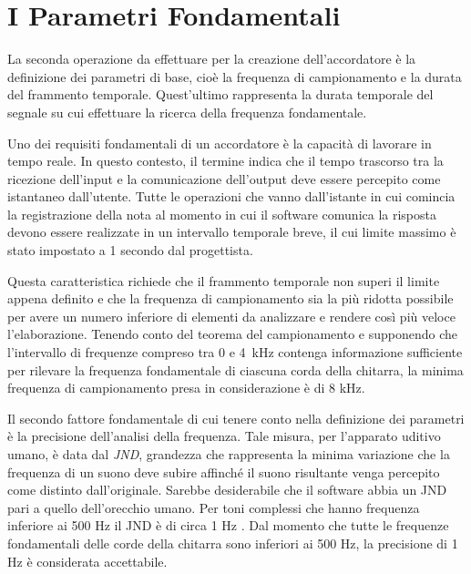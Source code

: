 \chapter{I Parametri Fondamentali}\label{cap:parametri}

La seconda operazione da effettuare per la creazione dell'accordatore è la definizione dei parametri di base, cioè la frequenza di campionamento e la durata del frammento temporale.
Quest'ultimo rappresenta la durata temporale del segnale su cui effettuare la ricerca della frequenza fondamentale.  

Uno dei requisiti fondamentali di un accordatore è la capacità di lavorare in tempo reale. 
In questo contesto, il termine indica che il tempo trascorso tra la ricezione dell'input e la comunicazione dell'output deve essere percepito come istantaneo dall'utente. 
Tutte le operazioni che vanno dall'istante in cui comincia la registrazione della nota al momento in cui il software comunica la risposta devono essere realizzate in un intervallo temporale breve, il cui limite massimo è stato impostato a 1 secondo dal progettista. 

Questa caratteristica richiede che il frammento temporale non superi il limite appena definito e che la frequenza di campionamento sia la più ridotta possibile per avere un numero inferiore di elementi da analizzare e rendere così più veloce l'elaborazione.
Tenendo conto del teorema del campionamento e supponendo che l'intervallo di frequenze compreso tra 0 e \mbox{4 kHz} contenga informazione sufficiente per rilevare la frequenza fondamentale di ciascuna corda della chitarra, la minima frequenza di campionamento presa in considerazione è di 8 kHz.

Il secondo fattore fondamentale di cui tenere conto nella definizione dei parametri è la precisione dell'analisi della frequenza.
Tale misura, per l'apparato uditivo umano, è data dal \emph{JND}, grandezza che rappresenta la minima variazione che la frequenza di un suono deve subire affinché il suono risultante venga percepito come distinto dall'originale.
Sarebbe desiderabile che il software abbia un \mbox{JND} pari a quello dell'orecchio umano. 
Per toni complessi che hanno frequenza inferiore ai 500 Hz il \mbox{JND} è di circa 1 Hz \cite{BenestySondhiHuang2008}. 
Dal momento che tutte le frequenze fondamentali delle corde della chitarra sono inferiori ai 500 Hz, la precisione di 1 Hz è considerata accettabile.

